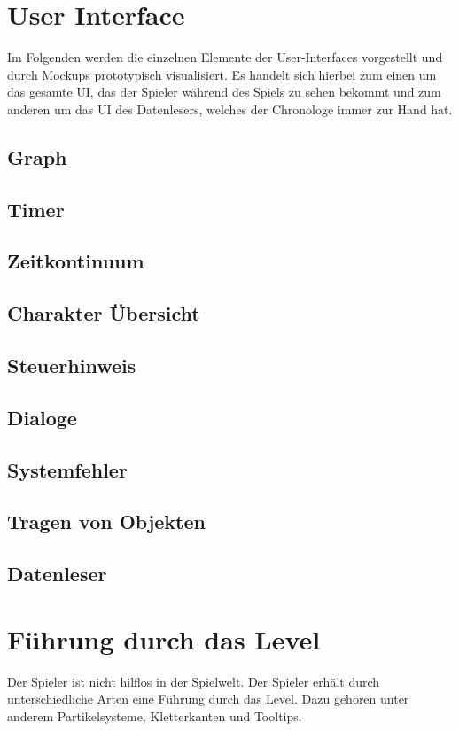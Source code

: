 \section{User Interface}\label{sec:user-interface}
Im Folgenden werden die einzelnen Elemente der User-Interfaces vorgestellt und durch Mockups prototypisch visualisiert. Es handelt sich hierbei zum einen um das gesamte \ac{UI}, das der Spieler während des Spiels zu sehen bekommt und zum anderen um das \ac{UI} des Datenlesers, welches der Chronologe immer zur Hand hat.
\subsection{Graph}
\subsection{Timer}\label{sec:user_timer}
\subsection{Zeitkontinuum}
\subsection{Charakter Übersicht}\label{sec:character-overview}
\subsection{Steuerhinweis}
\subsection{Dialoge}
\subsection{Systemfehler}
\subsection{Tragen von Objekten}
\subsection{Datenleser}\label{sec:datenleser_ui}
\section{Führung durch das Level}
Der Spieler ist nicht hilflos in der Spielwelt. Der Spieler erhält durch unterschiedliche Arten eine Führung durch das Level. Dazu gehören unter anderem Partikelsysteme, Kletterkanten und Tooltips.
